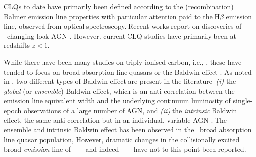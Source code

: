 \documentclass[fleqn,usenatbib]{mnras}
\begin{document}

CLQs to date have primarily been defined according to the
(recombination) Balmer emission line properties with particular
attention paid to the H$\beta$ emission line, observed from optical
spectroscopy. Recent works report on discoveries of \mgii\ changing-look
AGN \citep{Guo2019, Homan2020}. However, current CLQ studies have
primarily been at redshifts $z<1$.

While there have been many studies on triply ionised carbon, i.e.,
\civ, these have tended to focus on broad absorption line quasars
\citep[e.g., Table 1 of][]{Hemler2019} or the Baldwin effect
\citep{Baldwin1977, Bian2012, Jensen2016,
Hamann2017}. As noted in \citet{Rakic2017}, two different
types of Baldwin effect are present in the literature: {\it (i)} the {\it
global} (or {\it ensemble}) Baldwin effect, which is an
anti-correlation between the emission line equivalent width and the
underlying continuum luminosity of single-epoch observations of
a large number of AGN, and {\it (ii)} the {\it intrinsic} Baldwin
effect, the same anti-correlation but in an individual, variable 
AGN \citep{PoggePeterson1992}. The ensemble and intrinsic Baldwin effect 
has been observed in the \civ\ broad absorption line quasar population,
However, dramatic changes in the 
collisionally excited broad {\it emission} line of \civ\ --- and
indeed \ciii\ --- have not to this point been reported.
\end{document}
